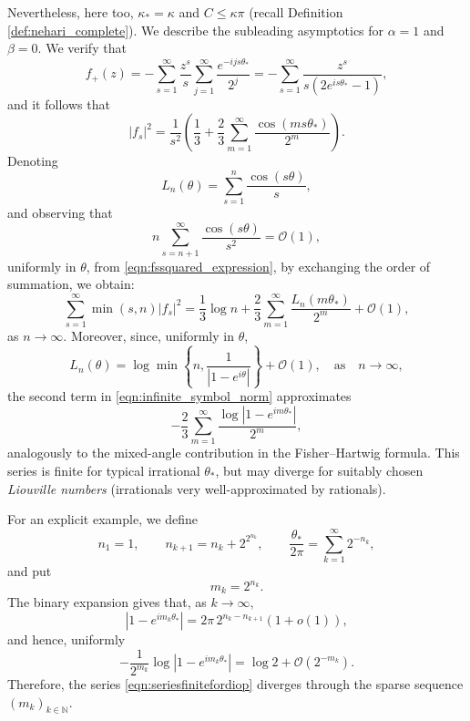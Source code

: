 \documentclass[11pt]{amsart}
\theoremstyle{plain}
\theoremstyle{remark}
\numberwithin{equation}{section}
\begin{document}
Nevertheless, here too, $\kappa_*=\kappa$ and $C\leq \kappa\pi$ (recall Definition \ref{def:nehari_complete}). We describe the
subleading asymptotics for $\alpha=1$ and $\beta=0$. We verify that
\[
f_+(z)
=
-\sum_{s=1}^{\infty}\frac{z^s}{s}
\sum_{j=1}^{\infty}\frac{e^{-ijs\theta_*}}{2^j}
=
-\sum_{s=1}^{\infty}
\frac{z^s}{s(2e^{is\theta_*}-1)},
\]
and it follows that
\begin{equation}\label{eqn:fssquared_expression}
|f_s|^2
=
\frac{1}{s^2}
\left(
\frac{1}{3}
+
\frac{2}{3}
\sum_{m=1}^{\infty}
\frac{\cos(ms\theta_*)}{2^m}
\right).
\end{equation}
%
Denoting
\[
L_n(\theta)
=
\sum_{s=1}^{n}\frac{\cos(s\theta)}{s},
\]
and observing that
\[
n\sum_{s=n+1}^{\infty}\frac{\cos(s\theta)}{s^2}
=
\mathcal{O}(1),
\]
uniformly in $\theta$, from \eqref{eqn:fssquared_expression}, by exchanging the order of summation, we obtain: 
\begin{equation}\label{eqn:infinite_symbol_norm}
\sum_{s=1}^{\infty}\min(s,n)|f_s|^2
=
\frac{1}{3}\log n
+
\frac{2}{3}
\sum_{m=1}^{\infty}\frac{L_n(m\theta_*)}{2^m}
+
\mathcal{O}(1),
\end{equation}
as $n\rightarrow\infty$. Moreover, since, uniformly in $\theta$, 
\begin{equation}\label{eqn:log_estimate}
L_n(\theta)
=
\log\min\left\{
n,\frac{1}{|1-e^{i\theta}|}
\right\}
+
\mathcal{O}(1),\quad\text{as}\quad n\rightarrow\infty,
\end{equation}
the second term in
\eqref{eqn:infinite_symbol_norm} approximates
\begin{equation}\label{eqn:seriesfinitefordiop}
-\frac{2}{3}
\sum_{m=1}^{\infty}
\frac{\log|1-e^{im\theta_*}|}{2^m},
\end{equation}
analogously to the mixed-angle
contribution in the Fisher--Hartwig formula.
This series is finite for typical irrational $\theta_*$, but may diverge
for suitably chosen \emph{Liouville numbers} (irrationals very well-approximated by rationals).

For an explicit example, we define
\begin{equation}\label{eqn:theta_star}
n_1=1,
\qquad
n_{k+1}=n_k+2^{2^{n_k}},
\qquad
\frac{\theta_*}{2\pi}
=
\sum_{k=1}^{\infty}2^{-n_k},
\end{equation}
and put
\[
m_k=2^{n_k}.
\]
The binary expansion gives that, as $k\rightarrow\infty,$
\[
|1-e^{im_k\theta_*}|
=
2\pi\,2^{n_k-n_{k+1}}(1+o(1)),
\]
and hence, uniformly
\begin{equation}\label{eqn:spike_estimate}
-\frac{1}{2^{m_k}}
\log|1-e^{im_k\theta_*}|
=
\log 2+\mathcal{O}(2^{-m_k}).
\end{equation}
Therefore, the  series  \eqref{eqn:seriesfinitefordiop} diverges through the sparse
sequence $(m_k)_{k\in\mathbb{N}}$.
\end{document}
